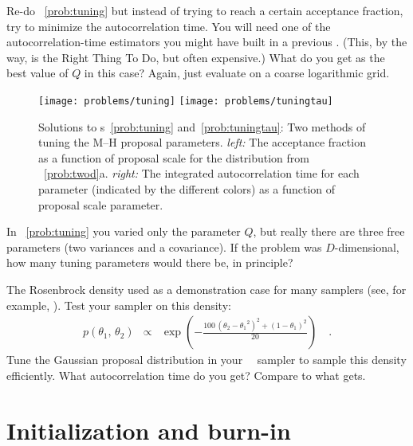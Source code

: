 \documentclass[modern]{aastex61}
\newcommand{\MCMC}{\acronym{MCMC}}
\newcommand{\MH}{\acronym{M--H}}
\begin{document}
\begin{problem}\label{prob:tuningtau}
Re-do \problemname~\ref{prob:tuning} but instead of trying to reach a
certain acceptance fraction, try to minimize the autocorrelation time.
You will need one of the autocorrelation-time estimators you might have
built in a previous \problemname.
(This, by the way, is the Right Thing To Do, but often expensive.)
What do you get as the best value of $Q$ in this case?
Again, just evaluate on a coarse logarithmic grid.
\end{problem}

\begin{figure}[!htbp]
\begin{center}
\texttt{[image: problems/tuning]}
\texttt{[image: problems/tuningtau]}
\end{center}
\caption{Solutions to \problemname s~\ref{prob:tuning} and~\ref{prob:tuningtau}:
Two methods of tuning the M--H proposal parameters.
\emph{left:} The acceptance fraction as a function of proposal scale for the
distribution from \problemname~\ref{prob:twod}a.
\emph{right:} The integrated autocorrelation time for each parameter
(indicated by the different colors) as a function of proposal scale parameter.}
\label{fig:tuning}
\end{figure}

\begin{problem}
In \problemname~\ref{prob:tuning} you varied only the parameter $Q$, but
really there are three free parameters (two variances and a covariance).
If the problem was $D$-dimensional, how many tuning parameters would there
be, in principle?
\end{problem}

\begin{problem}\label{prob:rosenbrock}
The Rosenbrock density used as a demonstration case for many samplers (see, for example, \citealt{gw}).
Test your sampler on this density:
\begin{eqnarray}
p(\theta_1,\,\theta_2) &\propto&
    \exp\left(-\frac{100\,(\theta_2-{\theta_1}^2)^2+(1-\theta_1)^2}{20}\right)
\quad.
\end{eqnarray}
Tune the Gaussian proposal distribution in your \MH\ \MCMC\ sampler to sample this density efficiently.
What autocorrelation time do you get?
Compare to what  gets.
\end{problem}

\section{Initialization and burn-in}\label{sec:initialization}
\end{document}
